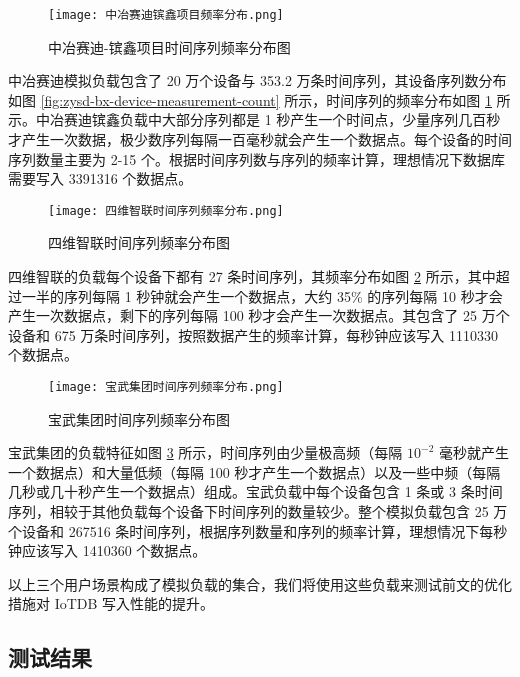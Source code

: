 \begin{figure}
  \centering
  \texttt{[image: 中冶赛迪镔鑫项目频率分布.png]}
  \caption{中冶赛迪-镔鑫项目时间序列频率分布图}
  \label{fig:zysd-bx-freq-distribution}
\end{figure}

中冶赛迪模拟负载包含了 20 万个设备与 353.2 万条时间序列，其设备序列数分布如图 \ref{fig:zysd-bx-device-measurement-count} 所示，时间序列的频率分布如图 \ref{fig:zysd-bx-freq-distribution} 所示。中冶赛迪镔鑫负载中大部分序列都是 1 秒产生一个时间点，少量序列几百秒才产生一次数据，极少数序列每隔一百毫秒就会产生一个数据点。每个设备的时间序列数量主要为 2-15 个。根据时间序列数与序列的频率计算，理想情况下数据库需要写入 3391316 个数据点。
\begin{figure}
  \centering
  \texttt{[image: 四维智联时间序列频率分布.png]}
  \caption{四维智联时间序列频率分布图}
  \label{fig:swzl-freq-distribution}
\end{figure} 

四维智联的负载每个设备下都有 27 条时间序列，其频率分布如图 \ref{fig:swzl-freq-distribution} 所示，其中超过一半的序列每隔 1 秒钟就会产生一个数据点，大约 35\% 的序列每隔 10 秒才会产生一次数据点，剩下的序列每隔 100 秒才会产生一次数据点。其包含了 25 万个设备和 675 万条时间序列，按照数据产生的频率计算，每秒钟应该写入 1110330 个数据点。

\begin{figure}
  \centering
  \texttt{[image: 宝武集团时间序列频率分布.png]}
  \caption{宝武集团时间序列频率分布图}
  \label{fig:bw-freq-distribution}
\end{figure}

宝武集团的负载特征如图 \ref{fig:bw-freq-distribution} 所示，时间序列由少量极高频（每隔 $10^{-2}$ 毫秒就产生一个数据点）和大量低频（每隔 100 秒才产生一个数据点）以及一些中频（每隔几秒或几十秒产生一个数据点）组成。宝武负载中每个设备包含 1 条或 3 条时间序列，相较于其他负载每个设备下时间序列的数量较少。整个模拟负载包含 25 万个设备和 267516 条时间序列，根据序列数量和序列的频率计算，理想情况下每秒钟应该写入 1410360 个数据点。


以上三个用户场景构成了模拟负载的集合，我们将使用这些负载来测试前文的优化措施对 IoTDB 写入性能的提升。 
\subsection{测试结果}

